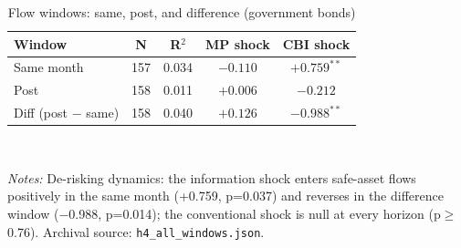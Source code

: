 \begin{table}[!tbp]
\centering\small
\caption{Flow windows: same, post, and difference (government bonds)}
\label{tab:81}
\begin{tabular}{lcccc}
\toprule
Window & N & R$^2$ & MP shock & CBI shock \\
\midrule
Same month & 157 & 0.034 & $-0.110$ & $+0.759^{**}$ \\
Post & 158 & 0.011 & $+0.006$ & $-0.212$ \\
Diff (post $-$ same) & 158 & 0.040 & $+0.126$ & $-0.988^{**}$ \\
\bottomrule
\end{tabular}
\\[2pt]\begin{minipage}{0.92\linewidth}\footnotesize\emph{Notes:} De-risking dynamics: the information shock enters safe-asset flows positively in the same month (+0.759, p=0.037) and reverses in the difference window ($-$0.988, p=0.014); the conventional shock is null at every horizon (p$\geq$0.76). Archival source: \texttt{h4\_all\_windows.json}.\end{minipage}
\end{table}
